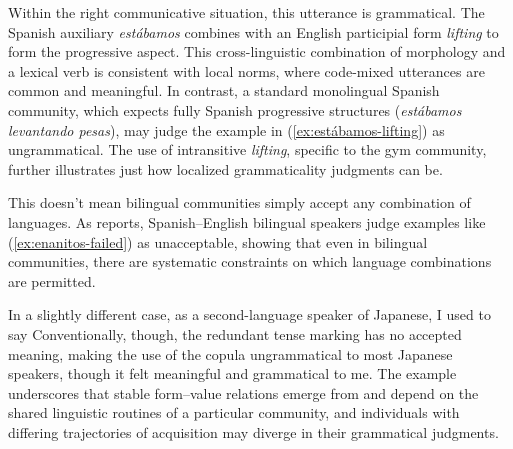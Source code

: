 \documentclass[12pt,letterpaper]{article}
\newcommand{\mention}[1]{\textit{#1}}
\newcommand{\olang}[1]{\textit{#1}}
\begin{document}
 \label{ex:estábamos-lifting}
\z
Within the right communicative situation, this utterance is grammatical. The Spanish auxiliary \olang{estábamos} combines with an English participial form \mention{lifting} to form the progressive aspect. This cross-linguistic combination of morphology and a lexical verb is consistent with local norms, where code-mixed utterances are common and meaningful. In contrast, a standard monolingual Spanish community, which expects fully Spanish progressive structures (\olang{estábamos levantando pesas}), may judge the example in (\ref{ex:estábamos-lifting}) as ungrammatical. The use of intransitive \mention{lifting}, specific to the gym community, further illustrates just how localized grammaticality judgments can be.

This doesn't mean bilingual communities simply accept any combination of languages. As \textcite{Toribio2001} reports, Spanish--English bilingual speakers judge examples like (\ref{ex:enanitos-failed}) as unacceptable, showing that even in bilingual communities, there are systematic constraints on which language combinations are permitted.

\label{ex:enanitos-failed}
\z

In a slightly different case, as a second-language speaker of Japanese, I used to say
\z
Conventionally, though, the redundant tense marking has no accepted meaning, making the use of the copula ungrammatical to most Japanese speakers, though it felt meaningful and grammatical to me. The example underscores that stable form--value relations emerge from and depend on the shared linguistic routines of a particular community, and individuals with differing trajectories of acquisition may diverge in their grammatical judgments.
\end{document}
